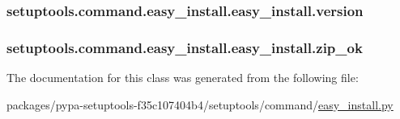 \subsubsection[{version}]{\setlength{\rightskip}{0pt plus 5cm}setuptools.\+command.\+easy\+\_\+install.\+easy\+\_\+install.\+version}\label{classsetuptools_1_1command_1_1easy__install_1_1easy__install_a1dabe7d517c80ceab2f0c8f34c50127d}
\hypertarget{classsetuptools_1_1command_1_1easy__install_1_1easy__install_a3cf027b47425e5bdedb5b0c6929346ba}{}
\subsubsection[{zip\+\_\+ok}]{\setlength{\rightskip}{0pt plus 5cm}setuptools.\+command.\+easy\+\_\+install.\+easy\+\_\+install.\+zip\+\_\+ok}\label{classsetuptools_1_1command_1_1easy__install_1_1easy__install_a3cf027b47425e5bdedb5b0c6929346ba}


The documentation for this class was generated from the following file\+:\begin{DoxyCompactItemize}
\item 
packages/pypa-\/setuptools-\/f35c107404b4/setuptools/command/\hyperlink{setuptools_2command_2easy__install_8py}{easy\+\_\+install.\+py}\end{DoxyCompactItemize}
